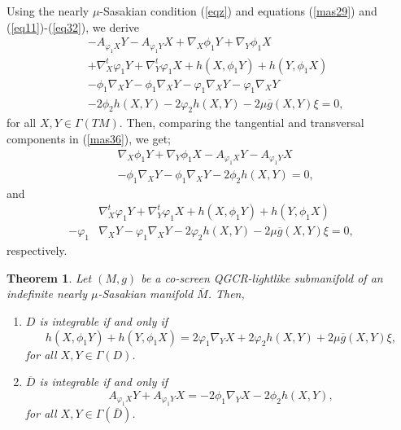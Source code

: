 \documentclass[reqno, 12pt]{amsart}
\numberwithin{equation}{section}
\newtheorem{theorem}{Theorem}[section]
\begin{document}
Using the nearly $\mu$-Sasakian condition (\ref{eqz}) and equations (\ref{mas29}) and (\ref{eq11})-(\ref{eq32}), we derive 
\begin{align}\label{mas36}
 &-A_{\varphi_{1}X}Y-A_{\varphi_{1}Y}X+\nabla_{X}\phi_{1}Y+\nabla_{Y}\phi_{1}X\nonumber\\
 &+\nabla^{t}_{X}\varphi_{1}Y+\nabla^{t}_{Y}\varphi_{1}X+ h(X,\phi_{1}Y)+h(Y,\phi_{1}X)\nonumber\\
 &-\phi_{1}\nabla_{X}Y-\phi_{1}\nabla_{X}Y-\varphi_{1}\nabla_{X}Y-\varphi_{1}\nabla_{X}Y\\
 &-2\phi_{2}h(X,Y)-2\varphi_{2} h(X,Y)-2\mu\overline{g}(X,Y)\xi=0,\nonumber
\end{align}
for all $X,Y\in\Gamma(TM)$.
Then, comparing the tangential and transversal components in (\ref{mas36}), we get;
\begin{align}\label{mas37}
&\nabla_{X}\phi_{1}Y+\nabla_{Y}\phi_{1}X-A_{\varphi_{1}X}Y-A_{\varphi_{1}Y}X\nonumber\\
&-\phi_{1}\nabla_{X}Y-\phi_{1}\nabla_{X}Y-2\phi_{2}h(X,Y)=0,
\end{align}
 and       
\begin{align}\label{mas38}
&\nabla^{t}_{X}\varphi_{1}Y+\nabla^{t}_{Y}\varphi_{1}X+ h(X,\phi_{1}Y)+h(Y,\phi_{1}X)\nonumber \\ 
-\varphi_{1}&\nabla_{X}Y-\varphi_{1}\nabla_{X}Y-2\varphi_{2}h(X,Y)-2\mu\overline{g}(X,Y)\xi=0,
\end{align}
respectively.
\begin{theorem}
  Let $(M,g)$ be a co-screen QGCR-lightlike submanifold of an indefinite nearly $\mu$-Sasakian manifold $\overline{M}$. Then, 
  \begin{enumerate}
   \item $D$ is integrable if and only if 
       \begin{equation}\nonumber
         h(X,\phi_{1}Y)+h(Y,\phi_{1}X)=2\varphi_{1}\nabla_{Y}X+2\varphi_{2} h(X,Y)+2\mu\overline{g}(X,Y)\xi,
       \end{equation}
   for all $X,Y\in\Gamma(D)$.
  
  \item $\overline{D}$ is integrable if and only if 
  \begin{equation}\nonumber
      A_{\varphi_{1}X}Y+A_{\varphi_{1}Y}X=-2\phi_{1}\nabla_{Y}X-2\phi_{2}h(X,Y),
  \end{equation}
  for all $X,Y\in\Gamma(\overline{D})$.
  \end{enumerate}
\end{theorem}
\end{document}
